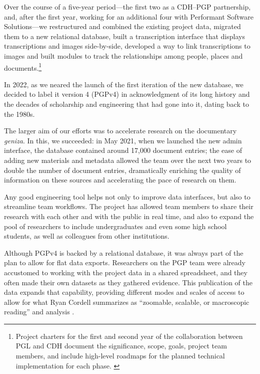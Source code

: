 \documentclass{article}
\begin{document}
Over the course of a five-year period—the first two as a CDH–PGP partnership, and, after the first year, working for an additional four with Performant Software Solutions—we restructured and combined the existing project data, migrated them to a new relational database, built a transcription interface that displays transcriptions and images side-by-side, developed a way to link transcriptions to images and built modules to track the relationships among people, places and documents.\footnote{ Project charters for the first and second year of the collaboration between PGL and CDH document the significance, scope, goals, project team members, and include high-level roadmaps for the planned technical implementation for each phase. \autocite{budak_cdh_2020, rustow_cdh_2022} } 

In 2022, as we neared the launch of the first iteration of the new database, we decided to label it version 4 (PGPv4) in acknowledgment of its long history and the decades of scholarship and engineering that had gone into it, dating back to the 1980s.

The larger aim of our efforts was to accelerate research on the documentary \textit{geniza}. In this, we succeeded: in May 2021, when we launched the new admin interface, the database contained around 17,000 document entries; the ease of adding new materials and metadata allowed the team over the next two years to double the number of document entries, dramatically enriching the quality of information on these sources and accelerating the pace of research on them.

Any good engineering tool helps not only to improve data interfaces, but also to streamline team workflows. The project has allowed team members to share their research with each other and with the public in real time, and also to expand the pool of researchers to include undergraduates and even some high school students, as well as colleagues from other institutions. 

Although PGPv4 is backed by a relational database, it was always part of the plan to allow for flat data exports. Researchers on the PGP team were already accustomed to working with the project data in a shared spreadsheet, and they often made their own datasets as they gathered evidence. This publication of the data expands that capability, providing different modes and scales of access to allow for what Ryan Cordell summarizes as “zoomable, scalable, or macroscopic reading” and analysis \citeyear{cordell_what_2017}.
\end{document}
